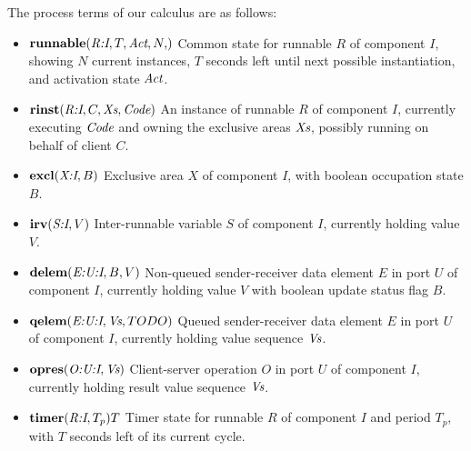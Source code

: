 \documentclass[twocolumn]{article}
\begin{document}
The process terms of our calculus are as follows:
\begin{itemize}
\item $\runnable{\adr{R:I}}{T}{\Act}{N}$  \newline
Common state for runnable $R$ of component $I$, showing $N$ current instances, $T$ seconds left until next possible instantiation, and activation state $\text{\it Act}$.
\item $\textbf{rinst}(\emph{R:I},C,\text{\it Xs},\text{\it Code})$ \newline
An instance of runnable $R$ of component $I$, currently executing $\text{\it Code}$ and owning the exclusive areas $\text{\it Xs}$, possibly running on behalf of client $C$.
\item $\textbf{excl}(\emph{X:I},B)$ \newline
Exclusive area $X$ of component $I$, with boolean occupation state $B$.
\item $\textbf{irv}(\emph{S:I},V)$ \newline
Inter-runnable variable $S$ of component $I$, currently holding value $V$.
\item $\textbf{delem}(\emph{E:U:I},B,V)$ \newline
Non-queued sender-receiver data element $E$ in port $U$ of component $I$, currently holding value $V$ with boolean update status flag $B$.
\item $\textbf{qelem}(\emph{E:U:I},\text{\it Vs},TODO)$ \newline
Queued sender-receiver data element $E$ in port $U$ of component $I$, currently holding value sequence $\text{\it Vs}$.
\item $\textbf{opres}(\emph{O:U:I},\text{\it Vs})$ \newline
Client-server operation $O$ in port $U$ of component $I$, currently holding result value sequence $\text{\it Vs}$.
\item $\textbf{timer}(\emph{R:I},T_p){T}$ \newline  %
Timer state for runnable $R$ of component $I$ and period $T_p$, with $T$ seconds left of its current cycle.
\end{itemize}
\end{document}
